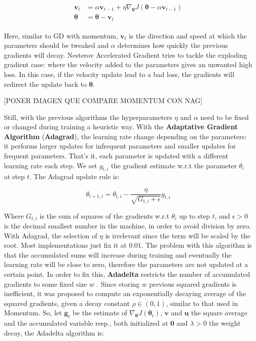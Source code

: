 \begin{align}
    \label{eqn:Nesterov_accelerated_gradient}
    \begin{split}
        \mathbf{v}_t &= \alpha \mathbf{v}_{t-1} + \eta \nabla_{\boldsymbol{\theta}} J(\boldsymbol{\theta} - \alpha \mathbf{v}_{t-1}) \\
        \boldsymbol{\theta} &= \boldsymbol{\theta} - \mathbf{v}_t
    \end{split}
\end{align}

Here, similar to GD with momentum, $\mathbf{v}_t$ is the direction and speed at which the parameters should be tweaked and $\alpha$ determines how quickly the previous gradients will decay. Nesterov Accelerated Gradient tries to tackle the exploding gradient case: where the velocity added to the parameters gives an unwanted high loss. In this case, if the velocity update lead to a bad loss, the gradients will redirect the update back to $\boldsymbol{\theta}$.

[PONER IMAGEN QUE COMPARE MOMENTUM CON NAG]

Still, with the previous algorithms the hyperparameters $\eta$ and $\alpha$ need to be fixed or changed during training a heuristic way. With the \textbf{Adaptative Gradient Algorithm} (\textbf{Adagrad}), the learning rate change depending on the parameters: it performs larger updates for infrequent parameters and smaller updates for frequent parameters. That's it, each parameter is updated with a different learning rate each step.
We set $g_{t,i}$ the gradient estimate w.r.t the parameter $\theta_i$ at step $t$. The Adagrad update rule is:

\begin{equation}
    \label{eqn:Adagrad}
    \theta_{t+1, i} = \theta_{t,i} - \frac{\eta}{\sqrt{G_{t,i} + \epsilon}} g_{t,i}
\end{equation}

Where $G_{t,i}$ is the sum of squares of the gradients w.r.t $\theta_i$ up to step $t$, and $\epsilon > 0$ is the decimal smallest number in the machine, in order to avoid division by zero. With Adagrad, the selection of $\eta$ is irrelevant since the term will be scaled by the root. Most implementations just fix it at $0.01$. The problem with this algorithm is that the accumulated sums will increase during training and eventually the learning rate will be close to zero, therefore the parameters are not updated at a certain point.
In order to fix this, \textbf{Adadelta} restricts the number of accumulated gradients to some fixed size $w$ \cite{zeiler2012}. Since storing $w$ previous squared gradients is inefficient, it was proposed to compute an exponentially decaying average of the squared gradients, given a decay constant $\rho \in (0,1)$, similar to that used in Momentum. So, let $\mathbf{g}_t$ be the estimate of $\nabla_{\boldsymbol{\theta}} J(\boldsymbol{\theta}_t)$, $\mathbf{v}$ and $\mathbf{u}$ the square average and the accumulated variable resp., both initialized at $\mathbf{0}$ and $\lambda>0$ the weight decay, the Adadelta algorithm is:

